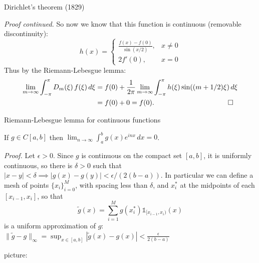 \documentclass[10pt,
               svgnames,
               hyperref={colorlinks,
                         citecolor=DeepPink4,
                         linkcolor=FireBrick,
                         urlcolor=blue},
               usepdftitle=false]{beamer}
\newcommand{\one}{\mathds{1}}
\newcommand{\eps}{\epsilon}
\newcommand{\ds}{\displaystyle}
\begin{document}
\begin{frame}{Dirichlet's theorem (1829)}

{\small
\noindent \emph{Proof continued.}  So now we know that this function is continuous (removable discontinuity):
	$$h(x) = \begin{cases} \frac{f(x) - f(0)}{\sin(x/2)}, & x\ne 0 \\
	                       2f'(0), & x=0 \end{cases}$$
Thus by the Riemann-Lebesgue lemma:
\begin{align*}
\lim_{m\to\infty} \int_{-\pi}^\pi D_m(\xi)\, f(\xi)\,d\xi &= f(0) + \frac{1}{2\pi} \lim_{m\to\infty}  \int_{-\pi}^\pi h(\xi) \sin((m+1/2)\xi)\,d\xi \\
&= f(0) + 0 = f(0).  \hspace{30mm} \qed
\end{align*}
}
\end{frame}


\begin{frame}{Riemann-Lebesgue lemma for continuous functions}

\begin{lemma}
If $g \in C[a,b]$ then $\ds \lim_{n\to\infty} \int_a^b g(x) e^{inx}\,dx = 0$.
\end{lemma}

{\small
\noindent \emph{Proof.}  Let $\eps>0$.  Since $g$ is continuous on the compact set $[a,b]$, it is uniformly continuous, so there is $\delta>0$ such that $|x-y|<\delta \implies |g(x)-g(y)|<\eps/(2(b-a))$.  In particular we can define a mesh of points $\{x_i\}_{i=0}^M$, with spacing less than $\delta$, and $x_i^*$ at the midpoints of each $[x_{i-1},x_i]$, so that
	$$\tilde g(x) = \sum_{i=1}^M g(x_i^*) \one_{[x_{i-1},x_i)}(x)$$
is a uniform approximation of $g$: \quad $\ds \|\tilde g - g\|_\infty = \sup_{x\in [a,b]} |\tilde g(x) - g(x)| < \frac{\eps}{2(b-a)}$

picture:

\vspace{25mm}
}
\end{frame}
\end{document}
